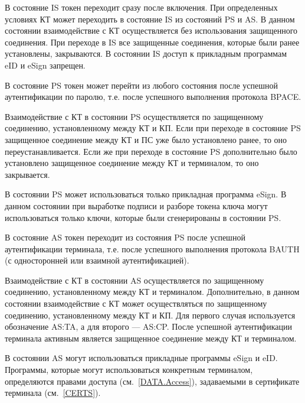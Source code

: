В состояние IS токен переходит сразу после включения.
При определенных условиях КТ может переходить в состояние
IS из состояний PS и AS.
В данном состоянии взаимодействие с КТ осуществляется без использования 
защищенного соединения. При переходе в IS все защищенные соединения, 
которые были ранее установлены, закрываются.
В состоянии IS доступ к прикладным программам eID и eSign запрещен.

В состояние PS токен может перейти из любого состояния 
после успешной аутентификации по паролю, 
т.е. после успешного выполнения протокола BPACE. 
%

Взаимодействие с КТ в состоянии PS осуществляется по 
защищенному соединению, установленному между КТ и КП. 
Если при переходе в состояние PS защищенное соединение между КТ и ПС уже было 
установлено ранее, то оно переустанавливается. 
Если же при переходе в состояние PS дополнительно было установлено 
защищенное соединение между КТ и терминалом, то оно закрывается.

В состоянии PS может использоваться только прикладная программа eSign.
В данном состоянии при выработке подписи и разборе токена ключа
могут использоваться только ключи, которые были 
сгенерированы в состоянии PS.

В состояние AS токен переходит из состояния PS 
после успешной аутентификации терминала, т.е. 
после успешного выполнения протокола BAUTH 
(с односторонней или взаимной аутентификацией). 

Взаимодействие с КТ в состоянии AS осуществляется по 
защищенному соединению, установленному между КТ и терминалом.
Дополнительно, в данном состоянии 
взаимодействие с КТ может осуществляться 
по защищенному соединению, установленному между КТ и КП.
Для первого случая используется обозначение AS:TA, 
а для второго --- AS:CP. 
После успешной аутентификации терминала
активным является защищенное соединение между КТ и терминалом.


В состоянии AS могут использоваться прикладные программы eSign и eID. 
Программы, которые могут использоваться конкретным терминалом,
определяются правами доступа (см.~\ref{DATA.Access}),
задаваемыми в сертификате терминала (см.~\ref{CERTS}).


